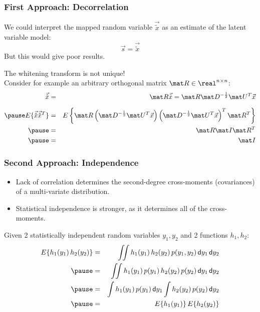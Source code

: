 \begin{frame}
  \frametitle{First Approach: Decorrelation}

  We could interpret the mapped random variable $\vec{\tilde{x}}$ as an estimate of the latent variable model:
  \begin{displaymath}
    \vec s = \vec{\tilde x}
  \end{displaymath}
  But this would give poor results. \\[.3cm] \pause

   The whitening transform is not unique! \\[.3cm]
  Consider for example an arbitrary orthogonal matrix $\mat R \in \real^{n \times n}$:
%
  \small
  \begin{eqnarray*}
    \vec{\hat x} 
    &=& \mat R \vec{\tilde x} = \mat R \mat D^{-\frac{1}{2}} \mat U^T \vec x \\[.2cm] \pause 
    E\{ \vec{\hat x} \vec{\hat x}^T \} 
    &=& E\left\{ \mat R \left(\mat D^{-\frac{1}{2}} \mat U^T \vec x \right) \left( \mat D^{-\frac{1}{2}} \mat U^T \vec x \right)^T \mat R^T \right\} \\ \pause 
    &=& \mat R \mat I \mat R^T \\ \pause 
    &=& \mat I
  \end{eqnarray*}
\end{frame}



\begin{frame}
  \frametitle{Second Approach: Independence}

  
  \begin{itemize}
    \item Lack of correlation determines the second-degree cross-moments (covariances) of a multi-variate distribution.
    \item Statistical independence is stronger, as it determines all of the cross-moments. \\[.3cm] \pause
  \end{itemize}

  Given 2 statistically independent random variables $y_1, y_2$ and 2 functions $h_1, h_2$:
  \footnotesize
  \begin{eqnarray*}
    E\{ h_1(y_1) \, h_2(y_2) \}
    &=& \iint h_1(y_1) \, h_2(y_2) \, p(y_1, y_2) \, \mathsf{d}y_1 \, \mathsf{d}y_2 \\ \pause 
    &=& \iint h_1(y_1) \, p(y_1) \, h_2(y_2) \, p(y_2) \, \mathsf{d}y_1 \, \mathsf{d}y_2 \\ \pause
    &=& \int h_1(y_1) \, p(y_1) \, \mathsf{d}y_1 \int h_2(y_2) \, p(y_2) \, \mathsf{d}y_2 \\ \pause 
    &=& E\{ h_1(y_1) \} \, E\{ h_2(y_2) \}
  \end{eqnarray*}
\end{frame}


